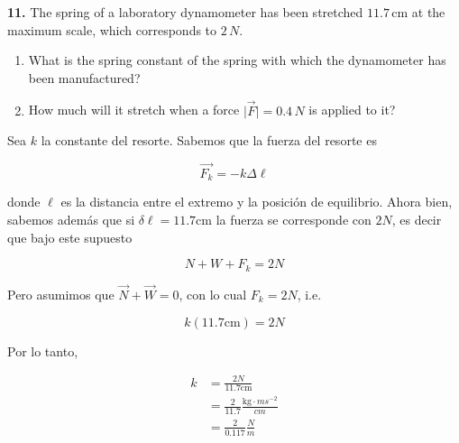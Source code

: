 \documentclass[12pt]{article}
\theoremstyle{definition}
\begin{document}
\pagebreak 


\begin{shaded}
\textbf{11.} The spring of a laboratory dynamometer has been stretched 
$11.7 \, \text{cm}$ at the maximum scale, which corresponds to $2 \, N$.

\begin{enumerate}[label=(\alph*)]
    \item What is the spring constant of the spring with which the dynamometer 
    has been manufactured?
    \item How much will it stretch when a force 
    $\lvert \vec{F} \rvert = 0.4 \, N$ is applied to it?
\end{enumerate}
\end{shaded}

Sea $k$ la constante del resorte. Sabemos que la fuerza del resorte es 

\begin{equation}
    \vec{F_k} = -k \Delta \ell
\end{equation}

donde $\ell$ es la distancia entre el extremo y la posición de equilibrio. Ahora
bien, sabemos además que si $\delta \ell = 11.7$cm la fuerza se corresponde con 
$2N$, es decir que bajo este supuesto

\begin{equation}
    N + W + F_k = 2N
\end{equation}

Pero asumimos que $\vec{N} + \vec{W} = 0$, con lo cual $F_k = 2N$, i.e. 

\begin{equation}
    k(11.7 \text{cm}) = 2N
\end{equation}

Por lo tanto, 

\begin{align*}
    k 
    &= \frac{2N}{11.7\text{cm}} \\ 
    &= \frac{2}{11.7} \frac{\text{kg} \cdot
    ms^{-2}}{cm} \\ 
    &=\frac{2}{0.117} \frac{N}{m}
\end{align*}

\pagebreak 
\end{document}
